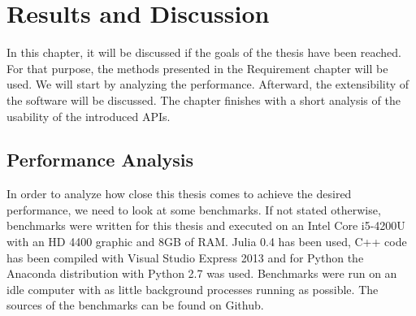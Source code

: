 \section{Results and Discussion}

In this chapter, it will be discussed if the goals of the thesis have been reached.
For that purpose, the methods presented in the Requirement chapter will be used. 
We will start by analyzing the performance. Afterward, the extensibility of the software will be discussed.
The chapter finishes with a short analysis of the usability of the introduced \ac{API}s.

\subsection{Performance Analysis}
In order to analyze how close this thesis comes to achieve the desired performance, we need to look at some benchmarks.
If not stated otherwise, benchmarks were written for this thesis and executed on an Intel Core i5-4200U with an HD 4400 graphic and 8GB of RAM.
Julia 0.4 has been used, C++ code has been compiled with Visual Studio Express 2013 and for Python the Anaconda distribution with Python 2.7 was used.
Benchmarks were run on an idle computer with as little background processes running as possible.
The sources of the benchmarks can be found on Github\cite{Benchmarks}.

